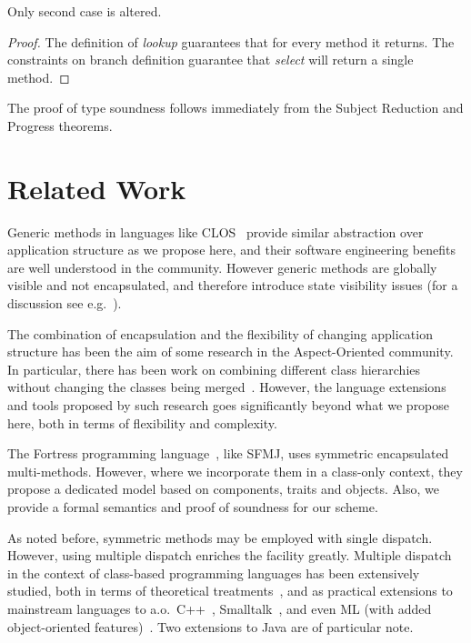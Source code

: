 \documentclass[11pt]{article}
\begin{document}
\noindent Only second case is altered.

\begin{proof}
The definition of \emph{lookup} guarantees that  for every method it returns. The constraints on branch definition guarantee that \emph{select} will return a single method.
\end{proof}

\medskip

The proof of type soundness follows immediately from the Subject Reduction and Progress theorems.








\section{Related Work}
\label{sec:related}

Generic methods in languages like CLOS~\cite{clos} provide similar abstraction over application structure as we propose here, and their software engineering benefits are well understood in the community. However generic methods are globally visible and not encapsulated, and therefore introduce state visibility issues (for a discussion see e.g.~\cite{binarymethods95}). 

The combination of encapsulation and the flexibility of changing application structure has been the aim of some research in the Aspect-Oriented community. In particular, there has been work on combining different class hierarchies without changing the classes being merged~\cite{sop,subjectod}. However, the language extensions and tools proposed by such research goes significantly beyond what we propose here, both in terms of flexibility and complexity.

The Fortress programming language~\cite{fortressmod,fortress}, like SFMJ, uses symmetric encapsulated multi-methods. However, where we incorporate them in a class-only context, they propose a dedicated model based on components, traits and objects. Also, we provide a formal semantics and proof of soundness for our scheme.

As noted before, symmetric methods may be employed with single dispatch. However, using multiple dispatch enriches the facility greatly. Multiple dispatch in the context of class-based programming languages has been extensively studied, both in terms of theoretical treatments~\cite{conflict}, and as practical extensions to mainstream languages to a.o.~C++~\cite{cpp}, Smalltalk~\cite{smalltalk}, and even ML (with added object-oriented features)~\cite{mlsub}. Two extensions to Java are of particular note.
\end{document}
